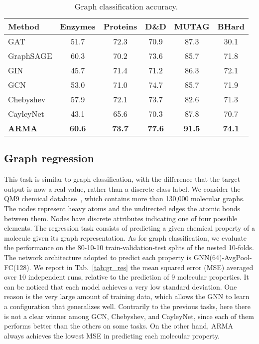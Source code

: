 \documentclass{article}
\begin{document}
\begin{table}
\caption{Graph classification accuracy.}
\setlength\tabcolsep{.2em} \small
\centering
\bgroup
\def\arraystretch{1.0} \begin{tabular}{lccccc}
\cmidrule[1.5pt]{1-6}
\textbf{Method} & \textbf{Enzymes} & \textbf{Proteins} & \textbf{D\&D} & \textbf{MUTAG} & \textbf{BHard} \\
\midrule
GAT             & 51.7\tiny{}  & 72.3\tiny{} & 70.9\tiny{}  & 87.3\tiny{}  & 30.1\tiny{} \\
GraphSAGE       & 60.3\tiny{}  & 70.2\tiny{} & 73.6\tiny{}  & 85.7\tiny{}  & 71.8\tiny{} \\
GIN             & 45.7\tiny{}  & 71.4\tiny{} & 71.2\tiny{}  & 86.3\tiny{}  & 72.1\tiny{} \\
\midrule
GCN             & 53.0\tiny{}  & 71.0\tiny{} & 74.7\tiny{}  & 85.7\tiny{}  & 71.9\tiny{} \\
Chebyshev       & 57.9\tiny{}  & 72.1\tiny{} & 73.7\tiny{}  & 82.6\tiny{}  & 71.3\tiny{} \\
CayleyNet       & 43.1\tiny{} & 65.6\tiny{} & 70.3\tiny{} & 87.8\tiny{} & 70.7\tiny{} \\
\textbf{ARMA}   & \textbf{60.6\tiny{}}  & \textbf{73.7\tiny{}} & \textbf{77.6\tiny{}}  & \textbf{91.5\tiny{}}  & \textbf{74.1\tiny{}} \\
\cmidrule[1.5pt]{1-6}
\end{tabular}
\egroup
\label{tab:gc_res}
\end{table}







\subsection{Graph regression}
This task is similar to graph classification, with the difference that the target output  is now a real value, rather than a discrete class label.
We consider the QM9 chemical database~\cite{ramakrishnan2014quantum}, which contains more than 130,000 molecular graphs.
The nodes represent heavy atoms and the undirected edges the atomic bonds between them. 
Nodes have discrete attributes indicating one of four possible elements. 
The regression task consists of predicting a given chemical property of a molecule given its graph representation.
As for graph classification, we evaluate the performance on the 80-10-10 train-validation-test splits of the nested 10-folds.
The network architecture adopted to predict each property is GNN(64)-AvgPool-FC(128).
We report in Tab.~\ref{tab:gr_res} the mean squared error (MSE) averaged over 10 independent runs, relative to the prediction of 9 molecular properties.
It can be noticed that each model achieves a very low standard deviation. 
One reason is the very large amount of training data, which allows the GNN to learn a configuration that generalizes well.
Contrarily to the previous tasks, here there is not a clear winner among GCN, Chebyshev, and CayleyNet, since each of them performs better than the others on some tasks.
On the other hand, ARMA always achieves the lowest MSE in predicting each molecular property. 
\end{document}
